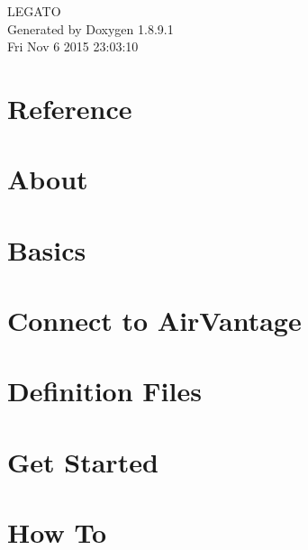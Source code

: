\documentclass[twoside]{book}
\newcommand{\+}{\discretionary{\mbox{\scriptsize$\hookleftarrow$}}{}{}}
\newcommand{\clearemptydoublepage}{%
  \newpage{\pagestyle{empty}\cleardoublepage}%
}
\begin{document}
\hypersetup{pageanchor=false,
             bookmarks=true,
             bookmarksnumbered=true,
             pdfencoding=unicode
            }
\begin{titlepage}
\vspace*{7cm}
\begin{center}%
{\Large L\+E\+G\+A\+T\+O }\\
\vspace*{1cm}
{\large Generated by Doxygen 1.8.9.1}\\
\vspace*{0.5cm}
{\small Fri Nov 6 2015 23:03:10}\\
\end{center}
\end{titlepage}
\clearemptydoublepage
\tableofcontents
\clearemptydoublepage
{}
\hypersetup{pageanchor=true}

\chapter{Reference}
\label{index}\hypertarget{index}{}
\chapter{About}
\label{about_main}
\hypertarget{about_main}{}

\chapter{Basics}
\label{basic_main}
\hypertarget{basic_main}{}

\chapter{Connect to Air\+Vantage}
\label{connecting_air_vantage}
\hypertarget{connecting_air_vantage}{}

\chapter{Definition Files}
\label{def_files}
\hypertarget{def_files}{}

\chapter{Get Started}
\label{getstarted_main}
\hypertarget{getstarted_main}{}

\chapter{How To}
\label{how_to_main}
\hypertarget{how_to_main}{}

\end{document}
